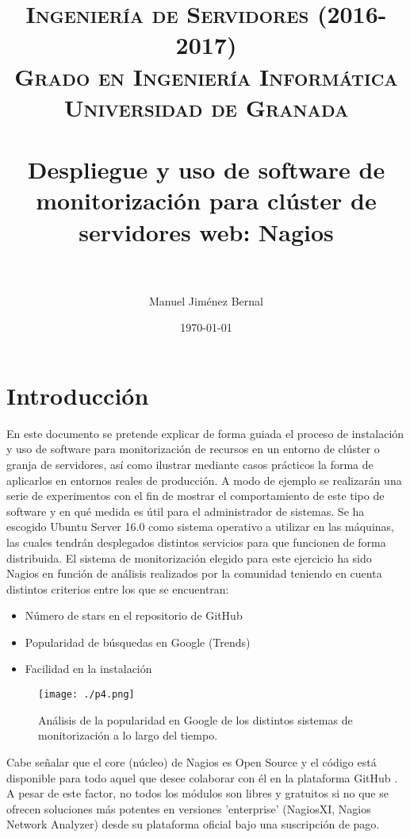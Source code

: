 \documentclass[paper=a4, fontsize=12pt]{scrartcl} %
\title{	
\normalfont \normalsize 
\textsc{{ Ingeniería de Servidores (2016-2017)} \\ Grado en Ingeniería Informática \\ Universidad de Granada} \\ [25pt] %
\horrule{0.5pt} \\[0.4cm] %
\huge Despliegue y uso de software de monitorización para clúster de servidores web: Nagios \\ %
\horrule{2pt} \\[0.5cm] %
}
\author{Manuel Jim\'enez Bernal} %
\date{\normalsize\today} %
\begin{document}
\maketitle %
\newpage
\tableofcontents %

\listoffigures
\newpage


\section{Introducción}
En este documento se pretende explicar de forma guiada el proceso de instalación y uso de software para monitorización de recursos en un entorno de clúster o granja de servidores, así como ilustrar mediante casos prácticos la forma de aplicarlos  en entornos reales de producción. A modo de ejemplo se realizarán una serie de experimentos con el fin de mostrar el comportamiento de este tipo de software y en qué medida es útil para el administrador de sistemas. Se ha escogido Ubuntu Server 16.0 como sistema operativo a utilizar en las máquinas, las cuales tendrán desplegados distintos servicios para que funcionen de forma distribuida.
El sistema de monitorización elegido para este ejercicio ha sido Nagios en función de análisis realizados por la comunidad teniendo en cuenta distintos criterios entre los que se encuentran:

\begin{itemize}
	\item Número de stars en el repositorio de GitHub \cite{p4}
	\item Popularidad de búsquedas en Google (Trends) \cite{p5}
	\item Facilidad en la instalación
\end{itemize}

\begin{figure}[H] %
	\centering
	\label{lsblk}
	\texttt{[image: ./p4.png]}
	\caption{Análisis de la popularidad en Google de los distintos sistemas de monitorización a lo largo del tiempo.} 
\end{figure}

Cabe señalar que el core (núcleo) de Nagios es Open Source y el código está disponible para todo aquel que desee colaborar con él en la plataforma GitHub \cite{p4}. A pesar de este factor, no todos los módulos son libres y gratuitos si no que se ofrecen soluciones más potentes en versiones 'enterprise' (NagiosXI, Nagios Network Analyzer) desde su plataforma oficial bajo una suscripción de pago. 
	
\end{document}
